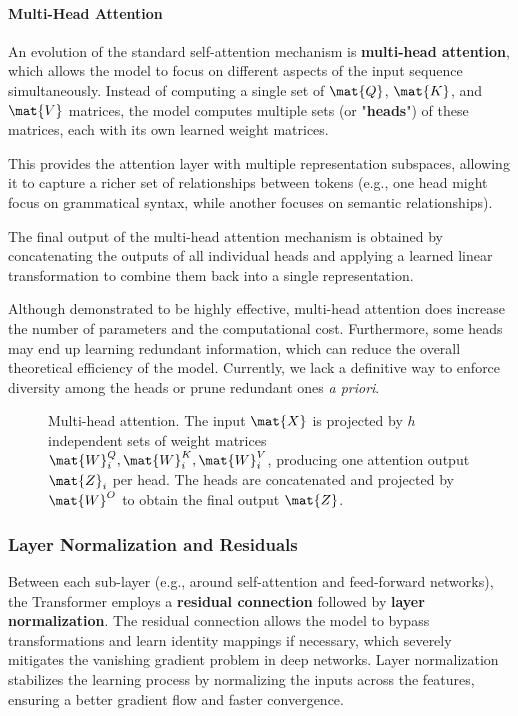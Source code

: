\paragraph{Multi-Head Attention}
An evolution of the standard self-attention mechanism is \textbf{multi-head attention}, which allows the model to focus on different aspects of the input sequence simultaneously.
Instead of computing a single set of \(\mat{Q}\), \(\mat{K}\), and \(\mat{V}\) matrices, the model computes multiple sets (or "\textbf{heads}") of these matrices, each with its own learned weight matrices.

This provides the attention layer with multiple representation subspaces, allowing it to capture a richer set of relationships between tokens (e.g., one head might focus on grammatical syntax, while another focuses on semantic relationships).

The final output of the multi-head attention mechanism is obtained by concatenating the outputs of all individual heads and applying a learned linear transformation to combine them back into a single representation.

Although demonstrated to be highly effective, multi-head attention does increase the number of parameters and the computational cost. Furthermore, some heads may end up learning redundant information, which can reduce the overall theoretical efficiency of the model. Currently, we lack a definitive way to enforce diversity among the heads or prune redundant ones \textit{a priori}.

\begin{figure}[H]
    \centering
    \resizebox{\textwidth}{!}{}
    \caption{Multi-head attention. The input $\mat{X}$ is projected by $h$ independent sets of weight matrices $\mat{W}_i^Q, \mat{W}_i^K, \mat{W}_i^V$, producing one attention output $\mat{Z}_i$ per head. The heads are concatenated and projected by $\mat{W}^O$ to obtain the final output $\mat{Z}$.}
\end{figure}

\subsubsection{Layer Normalization and Residuals}
Between each sub-layer (e.g., around self-attention and feed-forward networks), the Transformer employs a \textbf{residual connection} followed by \textbf{layer normalization}.
The residual connection allows the model to bypass transformations and learn identity mappings if necessary, which severely mitigates the vanishing gradient problem in deep networks.
Layer normalization stabilizes the learning process by normalizing the inputs across the features, ensuring a better gradient flow and faster convergence.

